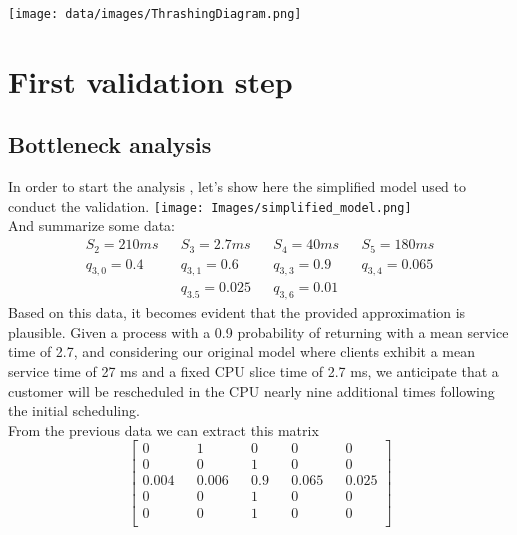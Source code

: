 \documentclass[12pt,a4paper]{article}
\begin{document}
\texttt{[image: data/images/ThrashingDiagram.png]}


\section{First validation step}
\subsection{Bottleneck analysis}
In order to start the analysis , let's show here the simplified model
used to conduct the validation.
\texttt{[image: Images/simplified\_model.png]}
\\And summarize some data:
\begin{displaymath}
    \begin{aligned}
        S_2 = 210ms  &  & S_3= 2.7ms     &  & S_4 = 40ms    &  & S_5=180ms      \\
        q_{3,0}= 0.4 &  & q_{3,1}=0.6    &  & q_{3,3} = 0.9 &  & q_{3,4}= 0.065 \\
                     &  & q_{3.5}= 0.025 &  & q_{3,6}=0.01  &  &
    \end{aligned}
\end{displaymath}
Based on this data, it becomes evident that the provided approximation is plausible. Given a process with a 0.9 probability of returning with a mean service time of 2.7, and considering our original model where clients exhibit a mean service time of 27 ms and a fixed CPU slice time of 2.7 ms, we anticipate that a customer will be rescheduled in the CPU nearly nine additional times following the initial scheduling. \\

From the previous data we can extract this matrix
\begin{displaymath}
    \begin{bmatrix}
        0     &  & 1     &  & 0   &  & 0     &  & 0     \\
        0     &  & 0     &  & 1   &  & 0     &  & 0     \\
        0.004 &  & 0.006 &  & 0.9 &  & 0.065 &  & 0.025 \\
        0     &  & 0     &  & 1   &  & 0     &  & 0     \\
        0     &  & 0     &  & 1   &  & 0     &  & 0     \\
    \end{bmatrix}
\end{displaymath}
\end{document}
